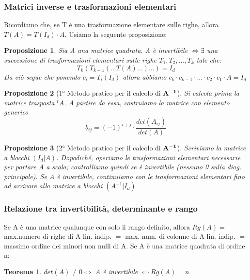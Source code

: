 \documentclass[12pt]{article}
\newenvironment{para}{\begin{adjustwidth}{13mm}{}}{\end{adjustwidth}}
\newtheorem{Teorema}{Teorema}[subsection]
\newtheorem{Proposizione}{Proposizione}[subsection]
\begin{document}
\begin{para}
\subsubsection{Matrici inverse e trasformazioni elementari}
Ricordiamo che, se T è una trasformazione elementare sulle righe, allora $T(A) = T(I_d)\cdot A$. Usiamo la seguente proposizione:
\begin{Proposizione}
    Sia A una matrice quadrata. A è invertibile $\Leftrightarrow \exists $ una successione di trasformazioni elementari sulle righe $T_1, T_2, ..., T_k$ tale che: $$T_k(T_{k-1}(...T(A)...)...) = I_d$$
    Da ciò segue che ponendo $c_i = T_i(I_d)$ allora abbiamo $c_k\cdot c_{k-1} \cdot ... \cdot c_2 \cdot c_1 \cdot A = I_d$
\end{Proposizione}
\begin{Proposizione}[1° Metodo pratico per il calcolo di $\bold{A^{-1}}$]
Si calcola prima la matrice trasposta $^tA$. A partire da essa, costruiamo la matrice con elemento generico $$b_{ij} = (-1)^{i+j}\cdot \frac{det(A_{ij})}{det(A)}$$
\end{Proposizione}
\begin{Proposizione}[2° Metodo pratico per il calcolo di $\bold{A^{-1}}$]
    Scriviamo la matrice a blocchi $(I_d|A)$. Dopodiché, operiamo le trasformazioni elementari necessarie per portare A a scala; controlliamo quindi se è invertibile (nessuno 0 sulla diag. principale). Se A è invertibile, continuiamo con le trasformazioni elementari fino ad arrivare alla matrice a blocchi $(A^{-1}|I_d)$
\end{Proposizione}
\subsubsection{Relazione tra invertibilità, determinante e rango}
Se A è una matrice qualunque con solo il rango definito, allora $Rg(A) = $ max.numero di righe di A lin. indip. $= $ max. num. di colonne di A lin. indip. $= $ massimo ordine dei minori non nulli di A.
\newline
Se A è una matrice quadrata di ordine n:
\begin{Teorema}
    $det(A) \neq 0 \Leftrightarrow $ A è invertibile $\Leftrightarrow Rg(A) = n$
\end{Teorema}

\end{para}
\end{document}

